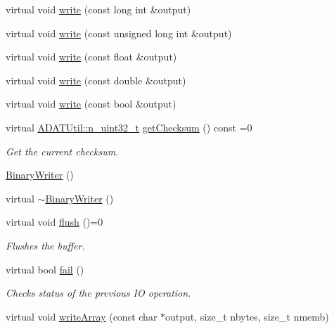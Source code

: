\begin{DoxyCompactItemize}
\item 
virtual void \mbox{\hyperlink{classADATIO_1_1BinaryWriter_a4cbdd50c040308cc568e3686cc5e3498}{write}} (const long int \&output)
\item 
virtual void \mbox{\hyperlink{classADATIO_1_1BinaryWriter_a56802b37bf83a416fc8b12fab0372306}{write}} (const unsigned long int \&output)
\item 
virtual void \mbox{\hyperlink{classADATIO_1_1BinaryWriter_afa3e113cbf2644b6a568fd13a8a14a98}{write}} (const float \&output)
\item 
virtual void \mbox{\hyperlink{classADATIO_1_1BinaryWriter_a35edd828ed0235e1547a76088c133f46}{write}} (const double \&output)
\item 
virtual void \mbox{\hyperlink{classADATIO_1_1BinaryWriter_ac74f1fed73f135b69624436713ba8fe9}{write}} (const bool \&output)
\item 
virtual \mbox{\hyperlink{namespaceADATUtil_ad945a8afa4db2d1f89b731964adae97e}{A\+D\+A\+T\+Util\+::n\+\_\+uint32\+\_\+t}} \mbox{\hyperlink{classADATIO_1_1BinaryWriter_a8bebb70a7248b14c8a4dcf7aa49c1503}{get\+Checksum}} () const =0
\begin{DoxyCompactList}\small\item\em Get the current checksum. \end{DoxyCompactList}\item 
\mbox{\hyperlink{classADATIO_1_1BinaryWriter_ab3eb202f6fb06059cf4dd2eba12280cf}{Binary\+Writer}} ()
\item 
virtual \mbox{\hyperlink{classADATIO_1_1BinaryWriter_a1c72b62cb3f48829de9f79f88ba618fd}{$\sim$\+Binary\+Writer}} ()
\item 
virtual void \mbox{\hyperlink{classADATIO_1_1BinaryWriter_a1d335eeed64094b8641f3ebf731c981e}{flush}} ()=0
\begin{DoxyCompactList}\small\item\em Flushes the buffer. \end{DoxyCompactList}\item 
virtual bool \mbox{\hyperlink{classADATIO_1_1BinaryWriter_af549adfdbe2c671008ad58952b34b06e}{fail}} ()
\begin{DoxyCompactList}\small\item\em Checks status of the previous IO operation. \end{DoxyCompactList}\item 
virtual void \mbox{\hyperlink{classADATIO_1_1BinaryWriter_a9a21d60e9c62d38226f7dd6989aa2d7d}{write\+Array}} (const char $\ast$output, size\+\_\+t nbytes, size\+\_\+t nmemb)

\end{DoxyCompactItemize}

